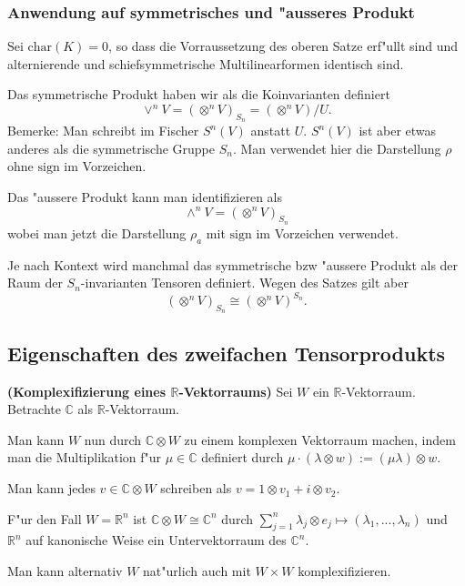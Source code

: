 \documentclass[9pt, a4paper, twocolumn, landscape]{article}
\begin{document}
{%
\subsubsection{Anwendung auf symmetrisches und "ausseres Produkt}
Sei $\mathrm{char}(K) = 0$, so dass die Vorraussetzung des oberen Satze erf"ullt sind und alternierende und schiefsymmetrische Multilinearformen identisch sind. 
\begin{remark}
Das symmetrische Produkt haben wir als die Koinvarianten definiert
$$
\vee^nV = (\otimes^n V)_{S_n} = (\otimes^n V) / U.
$$
Bemerke: Man schreibt im Fischer $S^n(V)$ anstatt $U$. $S^n(V)$ ist aber etwas anderes als die symmetrische Gruppe $S_n$.
Man verwendet hier die Darstellung $\rho$ ohne $\mathrm{sign}$ im Vorzeichen.
\end{remark}

\begin{remark}
Das "aussere Produkt kann man identifizieren als 
$$
\wedge^n V = (\otimes^nV)_{S_n}
$$
wobei man jetzt die Darstellung $\rho_a$ mit $\mathrm{sign}$ im Vorzeichen verwendet.
\end{remark}

\begin{remark}
Je nach Kontext wird manchmal das symmetrische bzw "aussere Produkt als der Raum der $S_n$-invarianten Tensoren definiert. Wegen des Satzes gilt aber
$$
(\otimes^n V)_{S_n} \cong (\otimes^n V)^{S_n}.
$$
\end{remark}

}

\subsection{Eigenschaften des zweifachen Tensorprodukts}


\begin{example}\textbf{(Komplexifizierung eines $\mathbb{R}$-Vektorraums)}
Sei $W$ ein $\mathbb{R}$-Vektorraum. Betrachte $\mathbb{C}$ als $\mathbb{R}$-Vektorraum. 

Man kann $W$ nun durch $\mathbb{C} \otimes W$ zu einem komplexen Vektorraum machen, indem man die Multiplikation f"ur $\mu \in \mathbb{C}$ definiert durch $\mu \cdot (\lambda \otimes w) := (\mu \lambda ) \otimes w$.

Man kann  jedes $v \in \mathbb{C} \otimes W$ schreiben als $v = 1 \otimes v_1 + i \otimes v_2$.

F"ur den Fall $W = \mathbb{R}^n$  ist $\mathbb{C} \otimes W \cong \mathbb{C}^n$ durch $\sum\limits_{j=1}^n \lambda_j \otimes e_j \mapsto (\lambda_1, ..., \lambda_n)$ und $\mathbb{R}^n $ auf kanonische Weise ein Untervektorraum des $\mathbb{C}^n$. 

Man kann alternativ $W$ nat"urlich auch mit $W\times W$ komplexifizieren.
\end{example}
\end{document}
